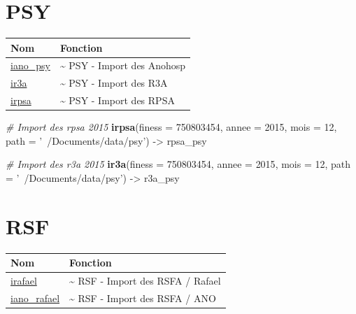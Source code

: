 \documentclass[]{book}
\newenvironment{Shaded}{\begin{snugshade}}{\end{snugshade}}
\newcommand{\CommentTok}[1]{\textcolor[rgb]{0.56,0.35,0.01}{\textit{#1}}}
\newcommand{\DataTypeTok}[1]{\textcolor[rgb]{0.13,0.29,0.53}{#1}}
\newcommand{\DecValTok}[1]{\textcolor[rgb]{0.00,0.00,0.81}{#1}}
\newcommand{\KeywordTok}[1]{\textcolor[rgb]{0.13,0.29,0.53}{\textbf{#1}}}
\newcommand{\NormalTok}[1]{#1}
\newcommand{\StringTok}[1]{\textcolor[rgb]{0.31,0.60,0.02}{#1}}
\begin{document}
\hypertarget{psy}{%
\section{PSY}\label{psy}}

\begin{longtable}[]{@{}ll@{}}
\toprule
Nom & Fonction\tabularnewline
\midrule
\endhead
\href{https://guillaumepressiat.github.io/pmeasyr/reference/iano_psy.html}{iano\_psy} & \textasciitilde{} PSY - Import des Anohosp\tabularnewline
\href{https://guillaumepressiat.github.io/pmeasyr/reference/ir3a.html}{ir3a} & \textasciitilde{} PSY - Import des R3A\tabularnewline
\href{https://guillaumepressiat.github.io/pmeasyr/reference/irpsa.html}{irpsa} & \textasciitilde{} PSY - Import des RPSA\tabularnewline
\bottomrule
\end{longtable}

\begin{Shaded}
\begin{Highlighting}[]
\CommentTok{# Import des rpsa 2015}
\KeywordTok{irpsa}\NormalTok{(}\DataTypeTok{finess =} \DecValTok{750803454}\NormalTok{,}
      \DataTypeTok{annee =} \DecValTok{2015}\NormalTok{,}
      \DataTypeTok{mois =} \DecValTok{12}\NormalTok{,}
      \DataTypeTok{path =} \StringTok{'~/Documents/data/psy'}\NormalTok{) ->}\StringTok{ }\NormalTok{rpsa_psy}

\CommentTok{# Import des r3a 2015}
\KeywordTok{ir3a}\NormalTok{(}\DataTypeTok{finess =} \DecValTok{750803454}\NormalTok{,}
      \DataTypeTok{annee =} \DecValTok{2015}\NormalTok{,}
      \DataTypeTok{mois =} \DecValTok{12}\NormalTok{,}
      \DataTypeTok{path =} \StringTok{'~/Documents/data/psy'}\NormalTok{) ->}\StringTok{ }\NormalTok{r3a_psy}
\end{Highlighting}
\end{Shaded}

\hypertarget{rsf}{%
\section{RSF}\label{rsf}}

\begin{longtable}[]{@{}ll@{}}
\toprule
Nom & Fonction\tabularnewline
\midrule
\endhead
\href{https://guillaumepressiat.github.io/pmeasyr/reference/irafael.html}{irafael} & \textasciitilde{} RSF - Import des RSFA / Rafael\tabularnewline
\href{https://guillaumepressiat.github.io/pmeasyr/reference/iano_rafael.html}{iano\_rafael} & \textasciitilde{} RSF - Import des RSFA / ANO\tabularnewline
\bottomrule
\end{longtable}
\end{document}
